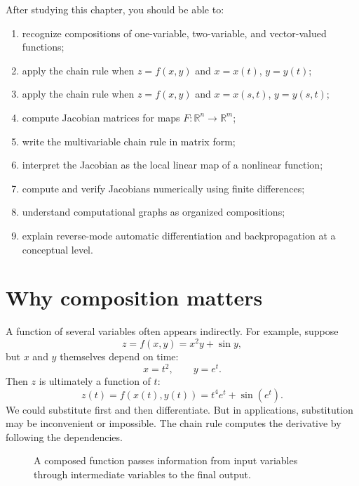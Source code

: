 \documentclass[11pt]{article}
\newcommand{\R}{\mathbb R}
\begin{document}
\begin{goalbox}
After studying this chapter, you should be able to:
\begin{enumerate}
  \item recognize compositions of one-variable, two-variable, and vector-valued functions;
  \item apply the chain rule when $z=f(x,y)$ and $x=x(t)$, $y=y(t)$;
  \item apply the chain rule when $z=f(x,y)$ and $x=x(s,t)$, $y=y(s,t)$;
  \item compute Jacobian matrices for maps $F:\R^n\to\R^m$;
  \item write the multivariable chain rule in matrix form;
  \item interpret the Jacobian as the local linear map of a nonlinear function;
  \item compute and verify Jacobians numerically using finite differences;
  \item understand computational graphs as organized compositions;
  \item explain reverse-mode automatic differentiation and backpropagation at a conceptual level.
\end{enumerate}
\end{goalbox}

\section{Why composition matters}

A function of several variables often appears indirectly. For example, suppose
\[
z=f(x,y)=x^2y+\sin y,
\]
but $x$ and $y$ themselves depend on time:
\[
x=t^2,\qquad y=e^t.
\]
Then $z$ is ultimately a function of $t$:
\[
z(t)=f(x(t),y(t))=t^4e^t+\sin(e^t).
\]
We could substitute first and then differentiate. But in applications, substitution may be inconvenient or impossible. The chain rule computes the derivative by following the dependencies.

\begin{figure}[H]
\centering
{}
\caption{A composed function passes information from input variables through intermediate variables to the final output.}
\end{figure}
\end{document}
